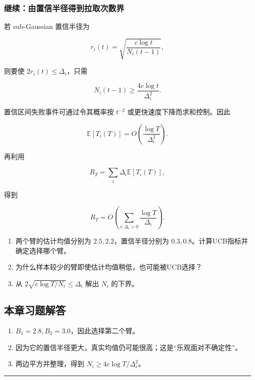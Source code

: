 \documentclass[
  11pt,
  a4paper,
]{ctexart}
\providecommand{\tightlist}{%
  \setlength{\itemsep}{0pt}\setlength{\parskip}{0pt}}
\begin{document}
\subsubsection*{继续：由置信半径得到拉取次数界}

若 sub-Gaussian 置信半径为

\[
r_i(t)=\sqrt{\frac{c\log t}{N_i(t-1)}},
\]

则要使 \(2r_i(t)\le\Delta_i\)，只需

\[
N_i(t-1)\ge\frac{4c\log t}{\Delta_i^2}.
\]

置信区间失败事件可通过令其概率按 \(t^{-2}\)
或更快速度下降而求和控制。因此

\[
\mathbb E[T_i(T)]
=O\left(\frac{\log T}{\Delta_i^2}\right).
\]

再利用

\[
R_T=\sum_i\Delta_i\mathbb E[T_i(T)],
\]

得到

\[
R_T=O\left(\sum_{i:\Delta_i>0}\frac{\log T}{\Delta_i}\right).
\]

\iffalse

\begin{enumerate}
\def\labelenumi{\arabic{enumi}.}
\tightlist
\item
  两个臂的估计均值分别为 \(2.5,2.2\)，置信半径分别为
  \(0.3,0.8\)。计算UCB指标并确定选择哪个臂。
\item
  为什么样本较少的臂即使估计均值稍低，也可能被UCB选择？
\item
  从 \(2\sqrt{c\log T/N_i}\le\Delta_i\) 解出 \(N_i\) 的下界。
\end{enumerate}

\subsection{本章习题解答}\label{ux672cux7ae0ux4e60ux9898ux89e3ux7b54-3}

\begin{enumerate}
\def\labelenumi{\arabic{enumi}.}
\tightlist
\item
  \(B_1=2.8,B_2=3.0\)，因此选择第二个臂。
\item
  因为它的置信半径更大，真实均值仍可能很高；这是``乐观面对不确定性''。
\item
  两边平方并整理，得到 \(N_i\ge4c\log T/\Delta_i^2\)。
\end{enumerate}

\begin{center}\rule{0.5\linewidth}{0.5pt}\end{center}
\end{document}
